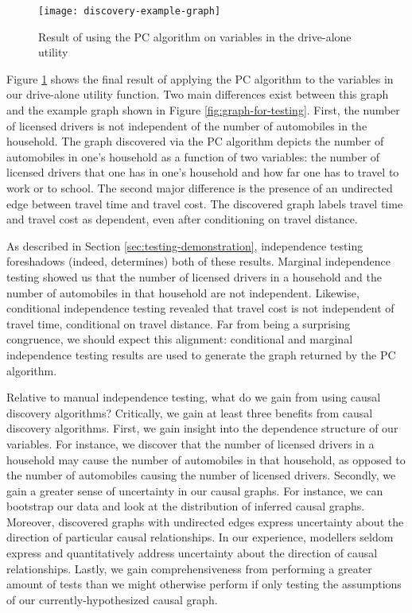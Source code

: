 \begin{figure}
   \centering
   \texttt{[image: discovery-example-graph]}
   \caption{Result of using the PC algorithm on variables in the drive-alone utility}
   \label{fig:discovery-example-graph}
\end{figure}

Figure \ref{fig:discovery-example-graph} shows the final result of applying the PC algorithm to the variables in our drive-alone utility function.
Two main differences exist between this graph and the example graph shown in Figure \ref{fig:graph-for-testing}.
First, the number of licensed drivers is not independent of the number of automobiles in the household.
The graph discovered via the PC algorithm depicts the number of automobiles in one's household as a function of two variables: the number of licensed drivers that one has in one's household and how far one has to travel to work or to school.
The second major difference is the presence of an undirected edge between travel time and travel cost.
The discovered graph labels travel time and travel cost as dependent, even after conditioning on travel distance.

As described in Section \ref{sec:testing-demonstration}, independence testing foreshadows (indeed, determines) both of these results.
Marginal independence testing showed us that the number of licensed drivers in a household and the number of automobiles in that household are not independent.
Likewise, conditional independence testing revealed that travel cost is not independent of travel time, conditional on travel distance.
Far from being a surprising congruence, we should expect this alignment: conditional and marginal independence testing results are used to generate the graph returned by the PC algorithm.

Relative to manual independence testing, what do we gain from using causal discovery algorithms?
Critically, we gain at least three benefits from causal discovery algorithms.
First, we gain insight into the dependence structure of our variables.
For instance, we discover that the number of licensed drivers in a household may cause the number of automobiles in that household, as opposed to the number of automobiles causing the number of licensed drivers.
Secondly, we gain a greater sense of uncertainty in our causal graphs.
For instance, we can bootstrap our data and look at the distribution of inferred causal graphs.
Moreover, discovered graphs with undirected edges express uncertainty about the direction of particular causal relationships.
In our experience, modellers seldom express and quantitatively address uncertainty about the direction of causal relationships.
Lastly, we gain comprehensiveness from performing a greater amount of tests than we might otherwise perform if only testing the assumptions of our currently-hypothesized causal graph.
